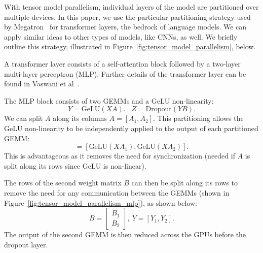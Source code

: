 \documentclass[sigconf,nonacm]{acmart}
\begin{document}
With tensor model parallelism, individual layers of the model are partitioned over multiple devices. In this paper, we use the particular partitioning strategy used by Megatron~\cite{shoeybi2019megatron} for transformer layers, the bedrock of language models. We can apply similar ideas to other types of models, like CNNs, as well. We briefly outline this strategy, illustrated in Figure~\ref{fig:tensor_model_parallelism}, below.

A transformer layer consists of a self-attention block followed by a two-layer multi-layer perceptron (MLP). Further details of the transformer layer can be found in Vaswani et al~\cite{vaswani2017attention}. 

The MLP block consists of two GEMMs and a GeLU non-linearity:
$$Y = \textrm{GeLU}(XA). \, \, \, \, \, Z = \textrm{Dropout}(YB).$$
We can split $A$ along its columns $A=[A_1, A_2]$. This partitioning allows the GeLU non-linearity to be independently applied to the output of each partitioned GEMM:
 \begin{equation}
    [Y_1, Y_2]= [\textrm{GeLU}(XA_1), \textrm{GeLU}(XA_2)].  \nonumber
 \end{equation}
 This is advantageous as it removes the need for synchronization (needed if $A$ is split along its rows since GeLU is non-linear).
 
 The rows of the second weight matrix $B$ can then be split along its rows to remove the need for any communication between the GEMMs (shown in Figure~\ref{fig:tensor_model_parallelism_mlp}), as shown below:
 \begin{equation}
    B=\begin{bmatrix}
        B_1 \\
        B_2
    \end{bmatrix}, \
     Y = [Y_1, Y_2]. \nonumber
 \end{equation}
 The output of the second GEMM is then reduced across the GPUs before the dropout layer.
 
\end{document}
